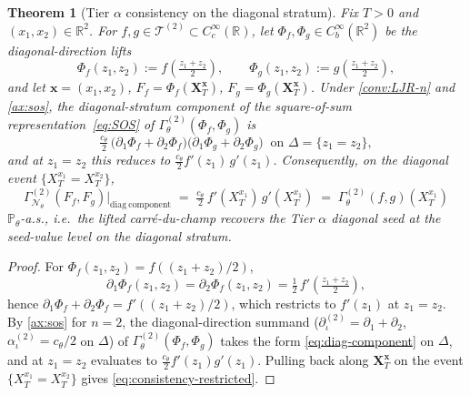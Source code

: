 \documentclass[11pt,reqno]{amsart}
\theoremstyle{plain}
\newtheorem{theorem}{Theorem}[section]
\theoremstyle{definition}
\theoremstyle{remark}
\newcommand{\R}{\mathbb R}
\newcommand{\Prob}{\mathbb P}
\newcommand{\cN}{\mathcal N}
\newcommand{\cT}{\mathcal T}
\newcommand{\GamN}{\Gamma^{(2)}_{\cN_{\theta}}}
\newcommand{\GamT}{\Gamma^{(2)}_{\theta}}
\newcommand{\GamM}[1]{\Gamma^{(#1)}_{\theta}}
\newcommand{\Pth}{\Prob_{\theta}}
\begin{document}
\begin{theorem}[Tier $\alpha$ consistency on the diagonal stratum]\label{thm:consistency}
Fix $T>0$ and $(x_{1},x_{2})\in\R^{2}$. For $f,g\in\cT^{(2)}\subset C_{c}^{\infty}(\R)$,
let $\Phi_{f},\Phi_{g}\in C_{b}^{\infty}(\R^{2})$ be the
\emph{diagonal-direction lifts}
\begin{equation}\label{eq:Phi-f}
  \Phi_{f}(z_{1},z_{2}):=f\!\left(\tfrac{z_{1}+z_{2}}{2}\right),
  \qquad
  \Phi_{g}(z_{1},z_{2}):=g\!\left(\tfrac{z_{1}+z_{2}}{2}\right),
\end{equation}
and let $\mathbf x=(x_{1},x_{2})$,
$F_{f}=\Phi_{f}(\mathbf X_{T}^{\mathbf x})$,
$F_{g}=\Phi_{g}(\mathbf X_{T}^{\mathbf x})$. Under
\cref{conv:LJR-n} and \cref{ax:sos}, the diagonal-stratum
component of the square-of-sum
representation~\eqref{eq:SOS} of $\GamM{2}(\Phi_{f},\Phi_{g})$ is
\begin{equation}\label{eq:diag-component}
  \tfrac{c_{\theta}}{2}\,
  \bigl(\partial_{1}\Phi_{f}+\partial_{2}\Phi_{f}\bigr)
  \bigl(\partial_{1}\Phi_{g}+\partial_{2}\Phi_{g}\bigr)
  \;\;\text{on }\Delta=\{z_{1}=z_{2}\},
\end{equation}
and at $z_{1}=z_{2}$ this reduces to
$\frac{c_{\theta}}{2}f'(z_{1})\,g'(z_{1})$. Consequently, on the
diagonal event $\{X^{x_{1}}_{T}=X^{x_{2}}_{T}\}$,
\begin{equation}\label{eq:consistency-restricted}
  \GamN(F_{f},F_{g})\big|_{\mathrm{diag\ component}}
  \;=\;\tfrac{c_{\theta}}{2}\,f'(X^{x_{1}}_{T})\,g'(X^{x_{1}}_{T})
  \;=\;\GamT(f,g)(X^{x_{1}}_{T})
\end{equation}
$\Pth$-a.s., i.e.\ the lifted carr\'e-du-champ recovers the Tier
$\alpha$ diagonal seed at the seed-value level on the diagonal
stratum.
\end{theorem}

\begin{proof}
For $\Phi_{f}(z_{1},z_{2})=f((z_{1}+z_{2})/2)$,
\[
  \partial_{1}\Phi_{f}(z_{1},z_{2})=\partial_{2}\Phi_{f}(z_{1},z_{2})
  =\tfrac12\,f'\!\left(\tfrac{z_{1}+z_{2}}{2}\right),
\]
hence $\partial_{1}\Phi_{f}+\partial_{2}\Phi_{f}=f'((z_{1}+z_{2})/2)$,
which restricts to $f'(z_{1})$ at $z_{1}=z_{2}$. By
\cref{ax:sos} for $n=2$, the diagonal-direction summand
($\partial^{(2)}_{\iota}=\partial_{1}+\partial_{2}$,
$\alpha^{(2)}_{\iota}=c_{\theta}/2$ on $\Delta$) of
$\GamM{2}(\Phi_{f},\Phi_{g})$ takes the form
\eqref{eq:diag-component} on $\Delta$, and at $z_{1}=z_{2}$
evaluates to $\tfrac{c_{\theta}}{2}f'(z_{1})g'(z_{1})$. Pulling back
along $\mathbf X_{T}^{\mathbf x}$ on the event
$\{X^{x_{1}}_{T}=X^{x_{2}}_{T}\}$ gives \eqref{eq:consistency-restricted}.
\end{proof}
\end{document}
